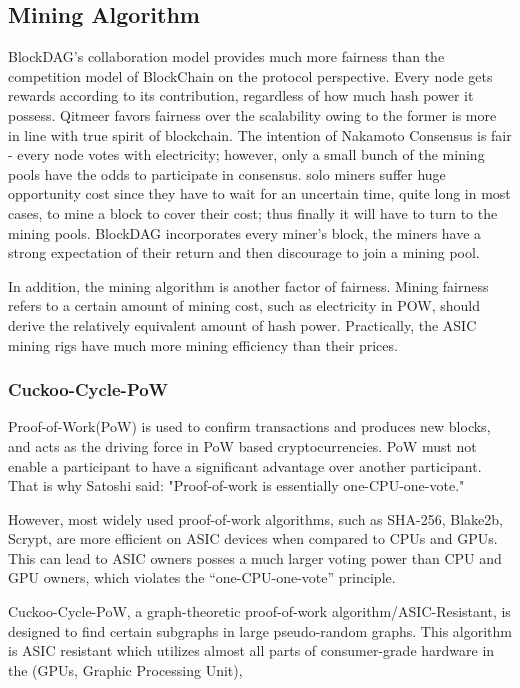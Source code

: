 \documentclass[a4paper,11pt]{article}
\begin{document}
\subsection{Mining Algorithm}
BlockDAG’s collaboration model provides much more fairness than the competition model of BlockChain on the protocol perspective. Every node gets rewards according to its contribution, regardless of how much hash power it possess. Qitmeer favors fairness over the scalability owing to the former is more in line with true spirit of blockchain. The intention of Nakamoto Consensus is fair - every node votes with electricity; however, only a small bunch of the mining pools have the odds to participate in consensus. solo miners suffer huge opportunity cost since they have to wait for an uncertain time, quite long in most cases, to mine a block to cover their cost; thus finally it will have to turn to the mining pools. BlockDAG incorporates every miner’s block, the miners have a strong expectation of their return and then discourage to join a mining pool.


In addition, the mining algorithm is  another factor of fairness. Mining fairness refers to a certain amount of mining cost, such as electricity in POW, should derive the relatively equivalent amount of hash power. Practically, the ASIC mining rigs have much more mining efficiency than their prices.

\subsubsection{Cuckoo-Cycle-PoW}
Proof-of-Work(PoW) is used to confirm transactions and produces new blocks, and acts as the driving force in PoW based cryptocurrencies. PoW must not enable a participant to have a significant advantage over another participant. That is why Satoshi said: "Proof-of-work is essentially one-CPU-one-vote."

However, most widely used proof-of-work algorithms, such as SHA-256, Blake2b, Scrypt, are more efficient on ASIC devices when compared to CPUs and GPUs. This can lead to ASIC owners posses a much larger voting power than CPU and GPU owners, which violates the “one-CPU-one-vote” principle.

Cuckoo-Cycle-PoW, a graph-theoretic proof-of-work algorithm/ASIC-Resistant, is designed to find certain subgraphs in large pseudo-random graphs. This algorithm is ASIC resistant which  utilizes almost all parts of consumer-grade hardware in the  (GPUs, Graphic Processing Unit),
\end{document}
